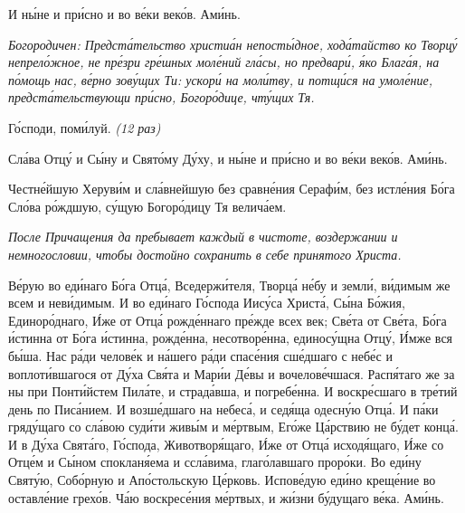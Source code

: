    И ны́не и при́сно и во ве́ки веко́в. Ами́нь.


 \itshape Богородичен:\normalfont{} Предста́тельство христиа́н непосты́дное, хода́тайство ко
Творцу́ непрело́жное, не пре́зри гре́шных моле́ний гла́сы, но предвари́, я́ко
Блага́я, на по́мощь нас, ве́рно зову́щих Ти: ускори́ на моли́тву, и
потщи́ся на умоле́ние, предста́тельствующи при́сно, Богоро́дице, чту́щих
Тя.


   Го́споди, поми́луй. \itshape (12 раз)\normalfont{}


   Сла́ва Отцу́ и Сы́ну и Свято́му Ду́ху, и ны́не и при́сно и во ве́ки веко́в.
Ами́нь.


   Честне́йшую Херуви́м и сла́внейшую без сравне́ния Серафи́м, без
истле́ния Бо́га Сло́ва ро́ждшую, су́щую Богоро́дицу Тя велича́ем.


 \itshape После Причащения да пребывает каждый в чистоте, воздержании и
немногословии, чтобы достойно сохранить в себе принятого Христа.\normalfont{}



\mychapterending




Ве́рую во еди́наго Бо́га Отца́, Вседержи́теля, Творца́ не́бу и
земли́, ви́димым же всем и неви́димым. И во еди́наго Го́спода Иису́са Христа́,
Сы́на Бо́жия, Единоро́днаго, И́же от Отца́ рожде́ннаго пре́жде всех век;
Све́та от Све́та, Бо́га и́стинна от Бо́га и́стинна, рожде́нна, несотворе́нна,
единосу́щна Отцу́, И́мже вся бы́ша. Нас ра́ди челове́к и на́шего ра́ди
спасе́ния сше́дшаго с небе́с и воплоти́вшагося от Ду́ха Свя́та и Мари́и Де́вы и
вочелове́чшася. Распя́таго же за ны при Понти́йстем Пила́те, и страда́вша, и
погребе́нна. И воскре́сшаго в тре́тий день по Писа́нием. И возше́дшаго на
небеса́, и седя́ща одесну́ю Отца́. И па́ки гряду́щаго со сла́вою суди́ти живы́м
и ме́ртвым, Его́же Ца́рствию не бу́дет конца́. И в Ду́ха Свята́го, Го́спода,
Животворя́щаго, И́же от Отца́ исходя́щаго, И́же со Отце́м и Сы́ном
спокланя́ема и ссла́вима, глаго́лавшаго проро́ки. Во еди́ну Святу́ю,
Собо́рную и Апо́стольскую Це́рковь. Испове́дую еди́но креще́ние во
оставле́ние грехо́в. Ча́ю воскресе́ния ме́ртвых, и жи́зни бу́дущаго ве́ка.
Ами́нь.


\mychapterending